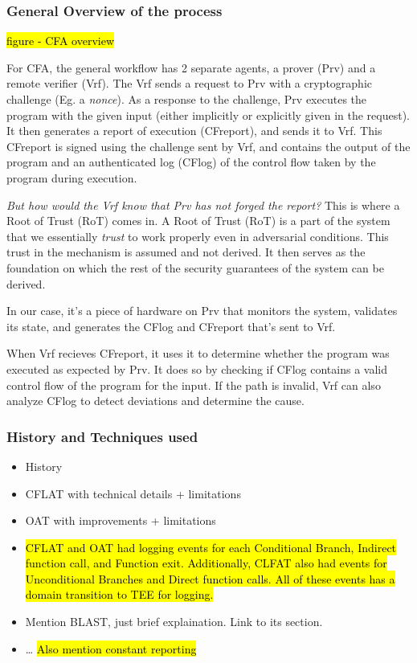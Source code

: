 \documentclass[a4paper, nobind]{templates/ociamthesis}
\providecommand{\tightlist}{%
  \setlength{\itemsep}{0pt}\setlength{\parskip}{0pt}}
\begin{document}
\subsubsection{General Overview of the process}\label{general-overview-of-the-process}

\hl{figure - CFA overview}

For CFA, the general workflow has 2 separate agents, a prover (Prv) and a remote verifier (Vrf).
The Vrf sends a request to Prv with a cryptographic challenge (Eg. a \emph{nonce}).
As a response to the challenge, Prv executes the program with the given
input (either implicitly or explicitly given in the request).
It then generates a report of execution (CFreport), and sends it to Vrf.
This CFreport is signed using the challenge sent by Vrf, and contains the output of the program and an
authenticated log (CFlog) of the control flow taken by the program during execution.

\emph{But how would the Vrf know that Prv has not forged the report?}
This is where a Root of Trust (RoT) comes in.
A Root of Trust (RoT) is a part of the system that we essentially \emph{trust} to work
properly even in adversarial conditions. This trust in the mechanism is assumed and not derived.
It then serves as the foundation on which the rest of the security guarantees
of the system can be derived.

In our case, it's a piece of hardware on Prv that monitors the system, validates its state,
and generates the CFlog and CFreport that's sent to Vrf.

When Vrf recieves CFreport, it uses it to determine whether the program was executed as expected by Prv.
It does so by checking if CFlog contains a valid control flow of the program
for the input. If the path is invalid, Vrf can also analyze CFlog to detect
deviations and determine the cause.

\subsubsection{History and Techniques used}\label{history-and-techniques-used-1}

\begin{itemize}
\tightlist
\item
  History
\item
  CFLAT with technical details + limitations
\item
  OAT with improvements + limitations
\item
  \hl{CFLAT and OAT had logging events for each Conditional Branch, Indirect function call, and Function exit.
  Additionally, CLFAT also had events for Unconditional Branches and Direct function calls.
  All of these events has a domain transition to TEE for logging.}
\item
  Mention BLAST, just brief explaination. Link to its section.
\item
  \ldots{}
  \hl{Also mention constant reporting}
\end{itemize}
\end{document}
